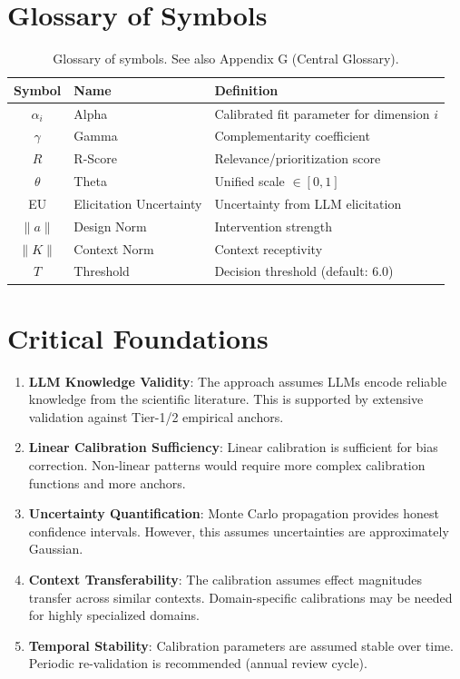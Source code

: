 \section{Glossary of Symbols}
\label{sec:iii-glossary}

\begin{table}[h]
\centering
\begin{tabular}{clp{8cm}}
\toprule
\textbf{Symbol} & \textbf{Name} & \textbf{Definition} \\
\midrule
$\alpha_i$ & Alpha & Calibrated fit parameter for dimension $i$ \\
$\gamma$ & Gamma & Complementarity coefficient \\
$R$ & R-Score & Relevance/prioritization score \\
$\theta$ & Theta & Unified scale $\in [0,1]$ \\
EU & Elicitation Uncertainty & Uncertainty from LLM elicitation \\
$\|a\|$ & Design Norm & Intervention strength \\
$\|K\|$ & Context Norm & Context receptivity \\
$T$ & Threshold & Decision threshold (default: 6.0) \\
\bottomrule
\end{tabular}
\caption{Glossary of symbols. See also Appendix G (Central Glossary).}
\end{table}


\section{Critical Foundations}
\label{sec:iii-foundations}

\begin{enumerate}
\item \textbf{LLM Knowledge Validity}: The approach assumes LLMs encode reliable
knowledge from the scientific literature. This is supported by extensive validation
against Tier-1/2 empirical anchors.

\item \textbf{Linear Calibration Sufficiency}: Linear calibration is sufficient
for bias correction. Non-linear patterns would require more complex calibration
functions and more anchors.

\item \textbf{Uncertainty Quantification}: Monte Carlo propagation provides honest
confidence intervals. However, this assumes uncertainties are approximately Gaussian.

\item \textbf{Context Transferability}: The calibration assumes effect magnitudes
transfer across similar contexts. Domain-specific calibrations may be needed for
highly specialized domains.

\item \textbf{Temporal Stability}: Calibration parameters are assumed stable over
time. Periodic re-validation is recommended (annual review cycle).
\end{enumerate}

